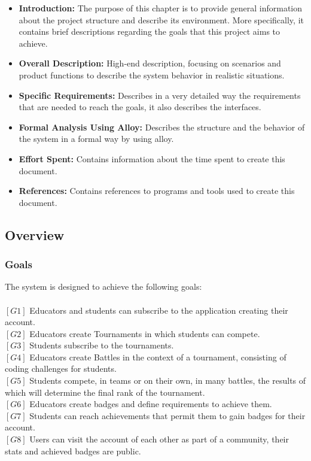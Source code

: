 \documentclass{article}
\begin{document}
\begin{itemize}
    \item \textbf{Introduction:} The purpose of this chapter is to provide general information about the project structure and describe its environment. More specifically, it contains brief descriptions regarding the goals that this project aims to achieve.
    \item \textbf{Overall Description:} High-end description, focusing on scenarios and product functions to describe the system behavior in realistic situations.
    \item \textbf{Specific Requirements:} Describes in a very detailed way the requirements that are needed to reach the goals, it also describes the interfaces.
    \item \textbf{Formal Analysis Using Alloy:} Describes the structure and the behavior of the system in a formal way by using alloy.
    \item \textbf{Effort Spent:} Contains information about the time spent to create this document.
    \item \textbf{References:} Contains references to programs and tools used to create this document.
\end{itemize}

\subsection{Overview}
\subsubsection{Goals}
The system is designed to achieve the following goals:\\\\
$[G1]$ Educators and students can subscribe to the application creating their account. \\
$[G2]$ Educators create Tournaments in which students can compete. \\
$[G3]$ Students subscribe to the tournaments. \\
$[G4]$ Educators create Battles in the context of a tournament, consisting of coding challenges for students.\\
$[G5]$ Students compete, in teams or on their own, in many battles, the results of which will determine the final rank of the tournament.  \\
$[G6]$ Educators create badges and define requirements to achieve them.\\
$[G7]$ Students can reach achievements that permit them to gain badges for their account.\\
$[G8]$ Users can visit the account of each other as part of a community, their stats and achieved badges are public.
\newpage
\end{document}
